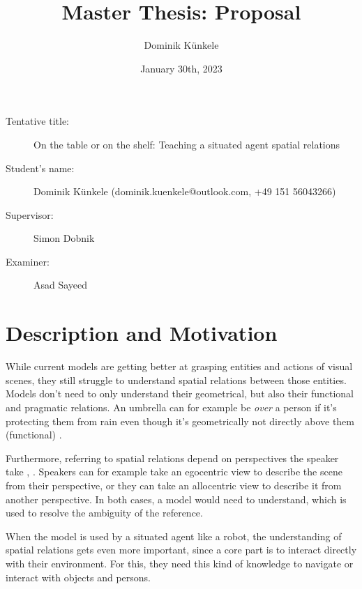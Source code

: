 \documentclass[
	11pt, %
]{fphw}
\title{Master Thesis: Proposal} %
\date{January 30th, 2023} %
\author{Dominik Künkele}
\institute{University of Gothenburg} %
\begin{document}
\maketitle %


\begin{description}
	\item[Tentative title:] On the table or on the shelf: Teaching a situated agent spatial relations
	\item[Student's name:] Dominik Künkele (dominik.kuenkele@outlook.com, +49 151 56043266)
	\item[Supervisor:] Simon Dobnik
	\item[Examiner:] Asad Sayeed
\end{description}

\section*{Description and Motivation}
While current models are getting better at grasping entities and actions of visual scenes, they still struggle to understand spatial relations between those entities. Models don't need to only understand their geometrical, but also their functional and pragmatic relations. An umbrella can for example be \emph{over} a person if it's protecting them from rain even though it's geometrically not directly above them (functional) \cite{Coventry2005}.

Furthermore, referring to spatial relations depend on perspectives the speaker take \cite{Lee2022}, \cite{Steels2006a}. Speakers can for example take an egocentric view to describe the scene from their perspective, or they can take an allocentric view to describe it from another perspective. In both cases, a model would need to understand, which is used to resolve the ambiguity of the reference.

When the model is used by a situated agent like a robot, the understanding of spatial relations gets even more important, since a core part is to interact directly with their environment. For this, they need this kind of knowledge to navigate or interact with objects and persons.
\end{document}
